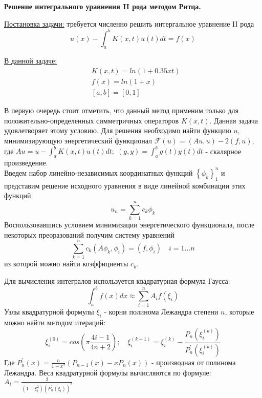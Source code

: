 \documentclass[a4paper,12pt]{report}
\begin{document}
\begin{center}
\Large
{\bf Решение интегрального уравнения II рода методом Ритца.}
\end{center}

\underline{Постановка задачи:} требуется численно решить интергальное уравнение II рода
\begin{equation}
u(x) - \int_a^b K(x,t)u(t)dt = f(x)
\end{equation}

\underline{В данной задаче:}
\begin{equation}
\begin{aligned}
& K(x,t) = ln(1+0.35xt) \\
& f(x) = ln(1+x) \\
& [a,b] = [0,1]
\end{aligned}
\end{equation}

В первую очередь стоит отметить, что данный метод применим только для положительно-определенных симметричных операторов $K(x,t)$. Данная задача удовлетворяет этому условию.
Для решения необходимо найти функцию $u$, минимизирующую энергетический функционал $\mathcal{F}(u)  = (Au,u) - 2(f,u)$, где 
$Au = u - \int_a^b K(x,t)u(t)dt; \; (g,y) = \int_a^b g(t)y(t)dt$ - скалярное произведение. \\
Введем набор линейно-независимых координатных функций $\left \{ \phi_k \right \}_1^n$ и представим решение исходного уравнения в виде линейной комбинации этих функций
\begin{equation}
u_n = \sum_{k=1}^n c_k \phi_k
\end{equation}
Воспользовавшись условием минимизации энергетического функционала, после некоторых преоразований получим систему уравнений
\begin{equation}
\sum_{k=1}^n c_k (A\phi_k, \phi_i) = (f, \phi_i) \quad i = 1 \dots n
\end{equation}
из которой можно найти коэффициенты $c_k$. \newline

Для вычисления интегралов используется квадратурная формула Гаусса:
\begin{equation}
\int_a^b f(x)dx \approx \sum_{i=1}^n A_i f(\xi_i)
\end{equation}
Узлы квадратурной формулы $\xi_i$ - корни полинома Лежандра степени $n$, которые можно найти методом итераций:
\begin{equation}
\xi_i^{(0)} = cos(\pi \frac{4i-1}{4n+2}); \quad \xi_i^{(k+1)} = \xi_i^{(k)} - \frac{P_n(\xi_i^{(k)})}{P_n^\prime(\xi_i^{(k)})}
\end{equation}
Где $P_n^\prime(x) = \frac{n}{1-x^2}(P_{n-1}(x) - xP_n(x))$ - производная от полинома Лежандра.
Веса квадратурной формулы вычисляются по формуле: $A_i = \frac{2}{(1-\xi_i^2)(P_n^\prime(\xi_i))^2}$ \newline
\end{document}
